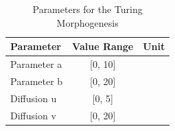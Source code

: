 \begin{table}[h]
\centering
\begin{tabular}{|l|c|r|}
\hline
Parameter & Value Range & Unit \\
\hline
Parameter a & [0, 10] &  \\
Parameter b & [0, 20] &  \\
Diffusion u & [0, 5] &  \\
Diffusion v & [0, 20] &  \\
\hline
\end{tabular}
\caption{Parameters for the Turing Morphogenesis}
\end{table}

